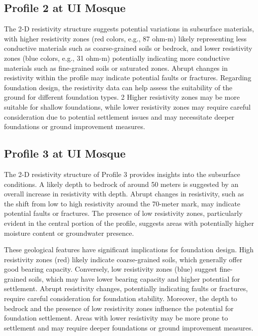 \documentclass[12pt,a4paper]{report}
\begin{document}
\subsection{Profile 2 at UI Mosque}
The 2-D resistivity structure suggests potential variations in subsurface materials, with higher resistivity zones (red colors, e.g., 87 ohm-m) likely representing less conductive materials such as coarse-grained soils or bedrock, and lower resistivity zones (blue colors, e.g., 31 ohm-m) potentially indicating more conductive materials such as fine-grained soils or saturated zones. Abrupt changes in resistivity within the profile may indicate potential faults or fractures. Regarding foundation design, the resistivity data can help assess the suitability of the ground for different foundation types. 2  Higher resistivity zones may be more suitable for shallow foundations, while lower resistivity zones may require careful consideration due to potential settlement issues and may necessitate deeper foundations or ground improvement measures.

\subsection{Profile 3 at UI Mosque}
The 2-D resistivity structure of Profile 3 provides insights into the subsurface conditions. A likely depth to bedrock of around 50 meters is suggested by an overall increase in resistivity with depth. Abrupt changes in resistivity, such as the shift from low to high resistivity around the 70-meter mark, may indicate potential faults or fractures. The presence of low resistivity zones, particularly evident in the central portion of the profile, suggests areas with potentially higher moisture content or groundwater presence.

These geological features have significant implications for foundation design. High resistivity zones (red) likely indicate coarse-grained soils, which generally offer good bearing capacity. Conversely, low resistivity zones (blue) suggest fine-grained soils, which may have lower bearing capacity and higher potential for settlement. Abrupt resistivity changes, potentially indicating faults or fractures, require careful consideration for foundation stability. Moreover, the depth to bedrock and the presence of low resistivity zones influence the potential for foundation settlement. Areas with lower resistivity may be more prone to settlement and may require deeper foundations or ground improvement measures.
\end{document}
